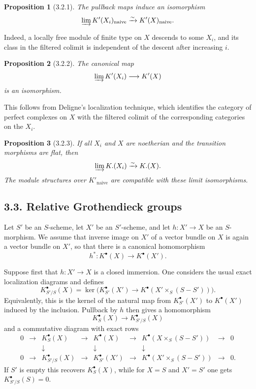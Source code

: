 \documentclass[13pt]{extarticle}
\newcommand{\iso}{\xrightarrow{\sim}}
\newtheorem*{proposition*}{Proposition}
\begin{document}
\begin{proposition*}[3.2.1]
The pullback maps induce an isomorphism
\[
\varinjlim K'(X_i)_{\mathrm{naive}}\iso K'(X)_{\mathrm{naive}}.
\]
\end{proposition*}

Indeed, a locally free module of finite type on $X$ descends to some $X_i$, and its class in the filtered colimit is independent of the descent after increasing $i$.

\begin{proposition*}[3.2.2]
The canonical map
\[
\varinjlim K'(X_i)\longrightarrow K'(X)
\]
is an isomorphism.
\end{proposition*}

This follows from Deligne's localization technique, which identifies the category of perfect complexes on $X$ with the filtered colimit of the corresponding categories on the $X_i$.

\begin{proposition*}[3.2.3]
If all $X_i$ and $X$ are noetherian and the transition morphisms are flat, then
\[
\varinjlim K.(X_i)\iso K.(X).
\]
The module structures over $K'_{\mathrm{naive}}$ are compatible with these limit isomorphisms.
\end{proposition*}


\subsection*{3.3. Relative Grothendieck groups}
Let $S'$ be an $S$-scheme, let $X'$ be an $S'$-scheme, and let $h:X'\to X$ be an $S$-morphism. We assume that inverse image on $X'$ of a vector bundle on $X$ is again a vector bundle on $X'$, so that there is a canonical homomorphism
\[
h^*:K^{\bullet}(X)\to K^{\bullet}(X').
\]

Suppose first that $h:X'\to X$ is a closed immersion. One considers the usual exact localization diagrams and defines
\[
K^{\bullet}_{S'/S}(X)=
\ker\bigl(K^{\bullet}_{S'}(X')\to K^{\bullet}(X'\times_S(S-S'))\bigr).
\]
Equivalently, this is the kernel of the natural map from $K^{\bullet}_{S'}(X')$ to $K^{\bullet}(X')$ induced by the inclusion. Pullback by $h$ then gives a homomorphism
\[
K^{\bullet}_S(X)\longrightarrow K^{\bullet}_{S'/S}(X)
\]
and a commutative diagram with exact rows
\[
\begin{array}{ccccccccc}
0&\to&K^{\bullet}_S(X)&\to&K^{\bullet}(X)&\to&K^{\bullet}(X\times_S(S-S'))&\to&0\\
&&\downarrow&&\downarrow&&\downarrow&&\\
0&\to&K^{\bullet}_{S'/S}(X)&\to&K^{\bullet}_{S'}(X')&\to&K^{\bullet}(X'\times_S(S-S'))&\to&0.
\end{array}
\]
If $S'$ is empty this recovers $K^{\bullet}_S(X)$, while for $X=S$ and $X'=S'$ one gets $K^{\bullet}_{S'/S}(S)=0$.
\end{document}
